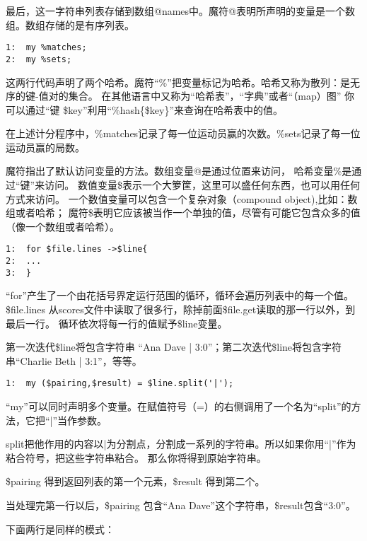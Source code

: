 \documentclass{ctexart}
\begin{document}
最后，这一字符串列表存储到数组@names中。魔符@表明所声明的变量是一个数组。数组存储的是有序列表。


\begin{lstlisting}
1:  my %matches;
2:  my %sets;
\end{lstlisting}
这两行代码声明了两个哈希。魔符“\%”把变量标记为哈希。哈希又称为散列：是无序的键-值对的集合。
在其他语言中又称为“哈希表”，“字典”或者“（map）图”
你可以通过“键 \$key”利用“\%hash\{\$key\}”来查询在哈希表中的值。

在上述计分程序中，\%matches记录了每一位运动员赢的次数。\%sets记录了每一位运动员赢的局数。

魔符指出了默认访问变量的方法。数组变量@是通过位置来访问，
哈希变量\%是通过“键”来访问。
数值变量\$表示一个大箩筐，这里可以盛任何东西，也可以用任何方式来访问。
一个数值变量可以包含一个复杂对象（compound object),比如：数组或者哈希；
魔符\$表明它应该被当作一个单独的值，尽管有可能它包含众多的值（像一个数组或者哈希）。

\begin{lstlisting}
1:  for $file.lines ->$line{
2:  ...
3:  }
\end{lstlisting}
“for”产生了一个由花括号界定运行范围的循环，循环会遍历列表中的每一个值。
\$file.lines 从scores文件中读取了很多行，除掉前面\$file.get读取的那一行以外，到最后一行。
循环依次将每一行的值赋予\$line变量。

第一次迭代\$line将包含字符串 “Ana Dave | 3:0”；第二次迭代\$line将包含字符串“Charlie Beth | 3:1”，等等。


\begin{lstlisting}
1:  my ($pairing,$result) = $line.split('|');
\end{lstlisting}
“my”可以同时声明多个变量。在赋值符号（=）的右侧调用了一个名为“split”的方法，它把“|”当作参数。

split把他作用的内容以|为分割点，分割成一系列的字符串。所以如果你用“|”作为粘合符号，把这些字符串粘合。
那么你将得到原始字符串。

\$pairing 得到返回列表的第一个元素，\$result 得到第二个。

当处理完第一行以后，\$pairing 包含“Ana Dave”这个字符串，\$result包含“3:0”。

下面两行是同样的模式：
\end{document}

